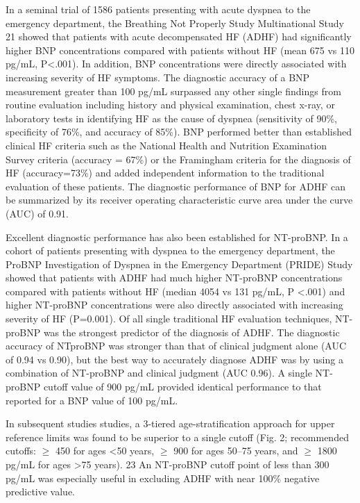 \documentclass[14pt,a4paper,onecolumn]{extarticle}
\begin{document}
In a seminal trial of 1586 patients presenting with acute dyspnea to the emergency department, the Breathing Not Properly Study Multinational Study 21 showed that patients with acute decompensated HF (ADHF) had significantly higher BNP concentrations compared with patients without HF (mean 675  vs 110  pg/mL, P<.001). In addition, BNP concentrations were directly associated with increasing severity of HF symptoms. The diagnostic accuracy of a BNP measurement greater than 100 pg/mL surpassed any other single findings from routine evaluation including history and physical examination, chest x-ray, or laboratory tests in identifying HF as the cause of dyspnea (sensitivity of 90\%, specificity of 76\%, and accuracy of 85\%). BNP performed better than established clinical HF criteria such as the National Health and Nutrition Examination Survey criteria (accuracy = 67\%) or the Framingham criteria for the diagnosis of HF (accuracy=73\%) and added independent information to the traditional evaluation of these patients. The diagnostic performance of BNP for ADHF can be summarized by its receiver operating characteristic curve area under the curve (AUC) of 0.91. \citep{Maisel2002}

Excellent diagnostic performance has also been established for NT-proBNP. In a cohort of patients presenting with dyspnea to the emergency department, the ProBNP Investigation of Dyspnea in the Emergency Department (PRIDE) Study showed that patients with ADHF had much higher NT-proBNP concentrations compared with patients without HF (median 4054 vs 131 pg/mL, P <.001) and higher NT-proBNP concentrations were also directly associated with increasing severity of HF (P=0.001). Of all single traditional HF evaluation techniques, NT-proBNP was the strongest predictor of the diagnosis of ADHF. The diagnostic accuracy of NTproBNP was stronger than that of clinical judgment alone (AUC of 0.94 vs 0.90), but the best way to accurately diagnose ADHF was by using a combination of NT-proBNP and clinical judgment (AUC 0.96). A single NT-proBNP cutoff value of 900 pg/mL provided identical performance to that reported for a BNP value of 100 pg/mL. \citep{Januzzi2005}

In subsequent studies studies, a 3-tiered age-stratification approach for upper reference limits was found to be superior to a single cutoff (Fig. 2; recommended cutoffs: $\geq$ 450 for ages <50 years, $\geq$ 900 for ages 50–75 years, and $\geq$ 1800 pg/mL for ages >75 years). 23 An NT-proBNP cutoff point of less than 300 pg/mL was especially useful in excluding ADHF with near 100\% negative predictive value. \citep{Januzzi2006a}
\end{document}
